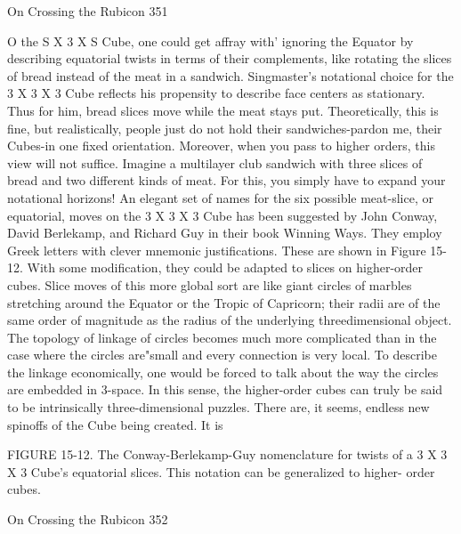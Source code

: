 On Crossing the Rubicon                                                            351

         O the S X 3 X S Cube, one could get affray with' ignoring the Equator by
describing equatorial twists in terms of their complements, like rotating the slices
of bread instead of the meat in a sandwich. Singmaster's notational choice for the 3
X 3 X 3 Cube reflects his propensity to describe face centers as stationary. Thus
for him, bread slices move while the meat stays put. Theoretically, this is fine, but
realistically, people just do not hold their sandwiches-pardon me, their Cubes-in
one fixed orientation. Moreover, when you pass to higher orders, this view will not
suffice. Imagine a multilayer club sandwich with three slices of bread and two
different kinds of meat. For this, you simply have to expand your notational
horizons!
         An elegant set of names for the six possible meat-slice, or equatorial,
moves on the 3 X 3 X 3 Cube has been suggested by John Conway, David
Berlekamp, and Richard Guy in their book Winning Ways. They employ Greek
letters with clever mnemonic justifications. These are shown in Figure 15-12. With
some modification, they could be adapted to slices on higher-order cubes.
         Slice moves of this more global sort are like giant circles of marbles
stretching around the Equator or the Tropic of Capricorn; their radii are of the
same order of magnitude as the radius of the underlying threedimensional object.
The topology of linkage of circles becomes much more complicated than in the
case where the circles are"small and every connection is very local. To describe the
linkage economically, one would be forced to talk about the way the circles are
embedded in 3-space. In this sense, the higher-order cubes can truly be said to be
intrinsically three-dimensional puzzles.
         There are, it seems, endless new spinoffs of the Cube being created. It is




       FIGURE 15-12. The Conway-Berlekamp-Guy nomenclature for twists of a
3 X 3 X 3 Cube's equatorial slices. This notation can be generalized to higher-
order cubes.




On Crossing the Rubicon                                                             352

